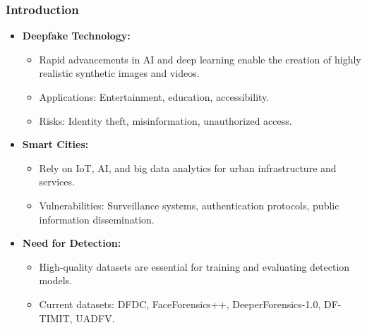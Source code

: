\documentclass{beamer}
\begin{document}
\begin{frame}
    \frametitle{Introduction}
    \begin{itemize}
        \item \textbf{Deepfake Technology:}
            \begin{itemize}
                \item Rapid advancements in AI and deep learning enable the creation of highly realistic synthetic images and videos.
                \item Applications: Entertainment, education, accessibility.
                \item Risks: Identity theft, misinformation, unauthorized access.
            \end{itemize}
        \item \textbf{Smart Cities:}
            \begin{itemize}
                \item Rely on IoT, AI, and big data analytics for urban infrastructure and services.
                \item Vulnerabilities: Surveillance systems, authentication protocols, public information dissemination.
            \end{itemize}
        \item \textbf{Need for Detection:}
            \begin{itemize}
                \item High-quality datasets are essential for training and evaluating detection models.
                \item Current datasets: DFDC, FaceForensics++, DeeperForensics-1.0, DF-TIMIT, UADFV.
            \end{itemize}
    \end{itemize}
\end{frame}
\end{document}
